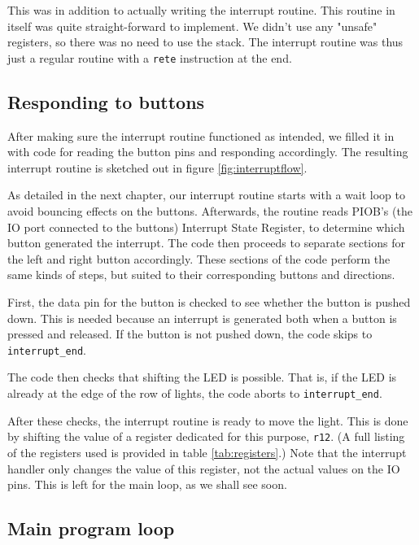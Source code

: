 This was in addition to actually writing the interrupt routine. This
routine in itself was quite straight-forward to implement. We didn't use
any "unsafe" registers, so there was no need to use the stack. The
interrupt routine was thus just a regular routine with a \texttt{rete}
instruction at the end.

\subsection{Responding to buttons}

After making sure the interrupt routine functioned as intended, we
filled it in with code for reading the button pins and responding
accordingly. The resulting interrupt routine is sketched out in figure
\ref{fig:interruptflow}.



As detailed in the next chapter, our interrupt routine starts with a
wait loop to avoid bouncing effects on the buttons. Afterwards, the
routine reads PIOB's (the IO port connected to the buttons) Interrupt
State Register, to determine which button generated the interrupt. The
code then proceeds to separate sections for the left and right button
accordingly. These sections of the code perform the same kinds of steps,
but suited to their corresponding buttons and directions.

First, the data pin for the button is checked to see whether the button
is pushed down. This is needed because an interrupt is generated both
when a button is pressed and released. If the button is not pushed down,
the code skips to \texttt{interrupt\_end}.

The code then checks that shifting the LED is possible. That is, if the
LED is already at the edge of the row of lights, the code aborts to
\texttt{interrupt\_end}.

After these checks, the interrupt routine is ready to move the light.
This is done by shifting the value of a register dedicated for this
purpose, \texttt{r12}. (A full listing of the registers used is provided
in table \ref{tab:registers}.) Note that the interrupt handler only
changes the value of this register, not the actual values on the IO
pins. This is left for the main loop, as we shall see soon.



\subsection{Main program loop}

